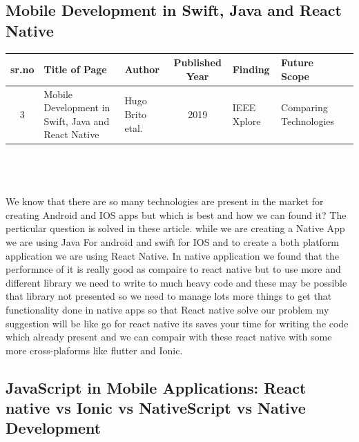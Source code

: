 \documentclass[12pt,a4paper]{article}
\begin{document}
\subsection*{Mobile Development in Swift, Java and React Native}
\begin{tabular}{ |c | m{2.5cm} | m{2cm}| c | m{2cm} | m{2cm} | c | }

  \hline
  sr.no & Title of Page & Author & Published Year & Finding & Future Scope  \\ 
  \hline
  3 &  Mobile Development in Swift, Java and React Native & Hugo Brito etal. &  2019 & IEEE Xplore & Comparing Technologies \\
\hline 
  
\end{tabular}
\\
\\
\\
We know that there are so many technologies are present in the market for creating Android and IOS apps but which is best and how we can found it? The perticular question is solved in these article. while we are creating a Native App we are using Java For android and swift for IOS and to create a both platform application we are using React Native. In native application we found that the performnce of it is really good as compaire to react native but to use more and different library  we need to write to much heavy code and these may be possible that library not presented so we need to manage lots more things to get that functionality done in native apps so that React native solve our problem my suggestion will be like go for react native its saves your time for writing the code which already present and we can compair with these react native with some more cross-plaforms like flutter  and Ionic.

\newpage
\subsection*{JavaScript in Mobile Applications: React native vs Ionic vs NativeScript vs Native Development}
\end{document}

